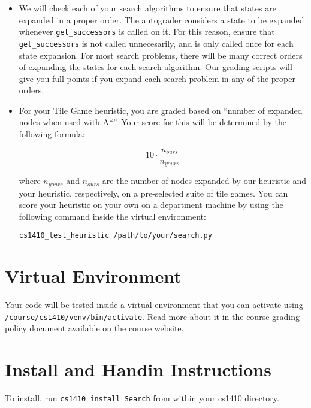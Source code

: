 \documentclass{article}
\begin{document}
\begin{itemize}
\item We will check each of your search algorithms to ensure that states are expanded in a proper order.
The autograder considers a state to be expanded whenever \verb|get_successors| is called on it.
For this reason, ensure that \verb|get_successors| is not called unnecesarily, and is only called once for each state expansion.
For most search problems, there will be many correct orders of expanding the states for each search algorithm.
Our grading scripts will give you full points if you expand each search problem in any of the proper orders.

\item For your Tile Game heuristic, you are graded based on ``number of expanded nodes when used with A*''.
Your score for this will be determined by the following formula:

\begin{equation}
10 \cdot \frac{n_{ours}}{n_{yours}}
\end{equation}

where $n_{yours}$ and $n_{ours}$ are the number of nodes expanded by our heuristic and your heuristic, respectively, on a pre-selected suite of tile games.
You can score your heuristic on your own on a department machine by using the following command inside the virtual environment:
\begin{verbatim}
cs1410_test_heuristic /path/to/your/search.py
\end{verbatim}



\end{itemize}

\section{Virtual Environment}

Your code will be tested inside a virtual environment that you can activate using \verb|/course/cs1410/venv/bin/activate|.
Read more about it in the course grading policy document available on the course website.

\section{Install and Handin Instructions}
To install, run \verb|cs1410_install Search| from within your cs1410 directory. ~\\
\end{document}
